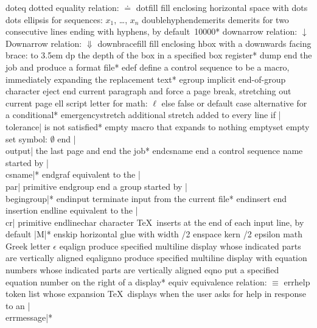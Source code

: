 \capcs doteq {dotted equality relation: $\doteq$}{}{}
\capcs dotfill {fill enclosing horizontal space with dots}{}{}
\capcs dots {ellipsis for sequences: $x_1$, \dots, $x_n$}{}{}
\capcs doublehyphendemerits {demerits for two consecutive lines ending
   with hyphens, by default~10000}*{}
\capcs downarrow {relation: $\downarrow$}{}{}
\capcs Downarrow {relation: $\Downarrow$}{}{}
\capcs downbracefill {fill enclosing hbox with a downwards facing brace:
   \hbox to 3.5em{\downbracefill}}{}{}
\capcs dp {the depth of the box in a specified box register}*{}
\capcs dump {end the job and produce a format file}*{}
\capcs edef {define a control sequence to be a macro, immediately expanding the
   replacement text}*{}
\capcs egroup {implicit end-of-group character}{}{}
\capcs eject {end current paragraph and force a page break,
   stretching out current page}{}{}
\capcs ell {script letter for math: $\ell$}{}{}
\capcs else {false or default case alternative for a conditional}*{\@else}
\capcs emergencystretch {additional stretch added to every line if
   |\\tol\-er\-ance| is not satisfied}*{}
\capcs empty {macro that expands to nothing}{}{}
\capcs emptyset {empty set symbol: $\emptyset$}{}{}
\capcs end {|\\output| the last page and end the job}*{}
\capcs endcsname {end a control sequence name started by
   |\\csname|}*{}
\capcs endgraf {equivalent to the |\\par| primitive}{}{}
\capcs endgroup {end a group started by |\\begingroup|}*{}
\capcs endinput {terminate input from the current file}*{}
\capcs endinsert {end insertion}{}{}
\capcs endline {equivalent to the |\\cr| primitive}{}{}
\capcs endlinechar {character \TeX\ inserts at the end of each input
   line, by default |\twocarets M|}*{}
\capcs enskip {horizontal glue with width /2\em}{}{}
\capcs enspace {kern /2\em}{}{}
\capcs epsilon {math Greek letter $\epsilon$}{}{}
\capcs eqalign {produce specified multiline display whose indicated parts
   are vertically aligned}{}{}
\capcs eqalignno {produce specified multiline display
   with equation numbers whose indicated parts are vertically aligned}{}{}
\capcs eqno {put a specified equation number on the right of a display}*{}
\capcs equiv {equivalence relation: $\equiv$}{}{}
\capcs errhelp {token list whose expansion \TeX\ displays when the user asks 
   for help in response to an |\\errmessage|}*{}
